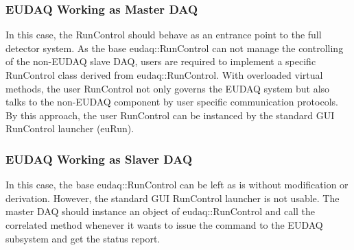 \subsubsection{EUDAQ Working as Master DAQ}
In this case, the RunControl should behave as an entrance point to the full detector system. As the base eudaq::RunControl can not manage the controlling of the non-EUDAQ slave DAQ, users are required to implement a specific RunControl class derived from eudaq::RunControl. With overloaded virtual methods, the user RunControl not only governs the EUDAQ system but also talks to the non-EUDAQ component by user specific communication protocols.\\
By this approach, the user RunControl can be instanced by the standard GUI RunControl launcher (euRun).

\subsubsection{EUDAQ Working as Slaver DAQ}
In this case, the base eudaq::RunControl can be left as is without modification or derivation. However, the standard GUI RunControl launcher is not usable. The master DAQ should instance an object
of eudaq::RunControl and call the correlated method whenever it wants to issue the command to the EUDAQ subsystem and get the status report.



